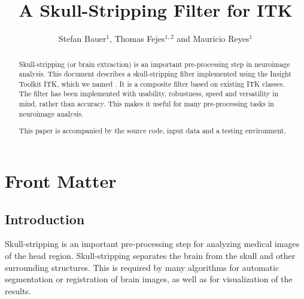 \documentclass{InsightArticle}
\title{A Skull-Stripping Filter for ITK}
\author{Stefan Bauer$^{1}$, Thomas Fejes$^{1,2}$ and Mauricio Reyes$^{1}$}
\newcommand{\IJhandlerIDnumber}{3353}
\begin{document}
%
% 
\IJhandlefooter{\IJhandlerIDnumber}


\ifpdf
\else
\fi


\maketitle


\ifhtml
\chapter*{Front Matter\label{front}}
\fi


\begin{abstract}
\noindent

Skull-stripping (or brain extraction) is an important pre-processing step in neuroimage analysis.
This document describes a skull-stripping filter implemented using the Insight Toolkit
ITK, which we named  . It is a composite filter based on existing ITK classes. The filter has been implemented with usability, robustness, speed and versatility in mind, rather than accuracy. This makes it useful for many pre-processing tasks in neuroimage analysis.

This paper is accompanied by the source code, input data and a testing environment.
\end{abstract}

\IJhandlenote{\IJhandlerIDnumber}

\tableofcontents


\section{Introduction}

Skull-stripping is an important pre-processing step for analyzing medical images of the head region. Skull-stripping separates the brain from the skull and other surrounding structures. This is required by many algorithms for automatic segmentation or registration of brain images, as well as for visualization of the results.
\end{document}
